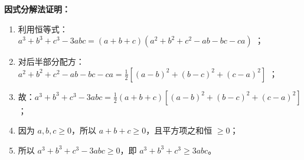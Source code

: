 \begin{proofbox}
\textbf{因式分解法证明：}
\begin{enumerate}
    \item 利用恒等式：$a^3+b^3+c^3-3abc = (a+b+c)(a^2+b^2+c^2-ab-bc-ca)$ ；
    \item 对后半部分配方：$a^2+b^2+c^2-ab-bc-ca = \frac{1}{2}[(a-b)^2 + (b-c)^2 + (c-a)^2]$ ；
    \item 故：$a^3+b^3+c^3-3abc = \frac{1}{2}(a+b+c)[(a-b)^2 + (b-c)^2 + (c-a)^2]$ ；
    \item 因为 $a,b,c \geqslant 0$，所以 $a+b+c \geqslant 0$，且平方项之和恒 $\geqslant 0$；
    \item 所以 $a^3+b^3+c^3-3abc \geqslant 0$，即 $a^3+b^3+c^3 \geqslant 3abc$。
\end{enumerate}
\end{proofbox}